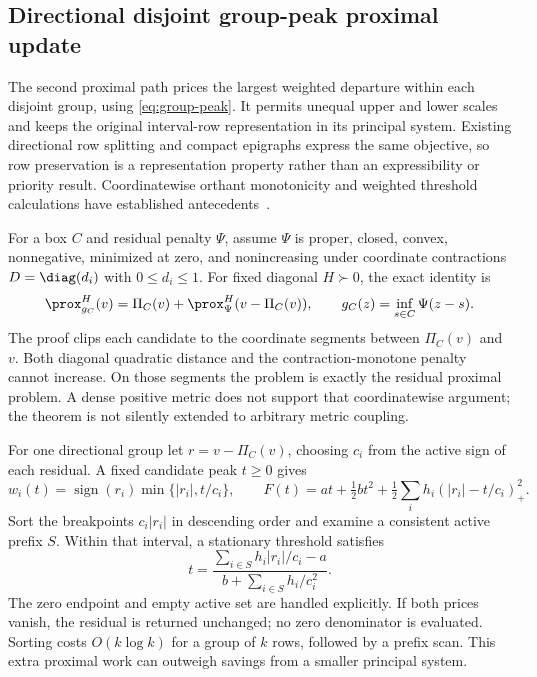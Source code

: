 \subsection{Directional disjoint group-peak proximal update}\label{sec:directional}
The second proximal path prices the largest weighted departure within each
disjoint group, using \eqref{eq:group-peak}. It permits unequal upper and lower
scales and keeps the original interval-row representation in its principal
system. Existing directional row splitting and compact epigraphs express the
same objective, so row preservation is a representation property rather than
an expressibility or priority result. Coordinatewise orthant monotonicity and
weighted threshold calculations have established antecedents~\cite{orthant,weighted}.

For a box $C$ and residual penalty $\Psi$, assume $\Psi$ is proper, closed,
convex, nonnegative, minimized at zero, and nonincreasing under coordinate
contractions $D=\diag(d_i)$ with $0\leq d_i\leq1$. For fixed diagonal $H\succ0$,
the exact identity is
\begin{equation}\label{eq:directional-prox}
 \prox_{g_C}^{H}(v)=\Pi_C(v)+\prox_{\Psi}^{H}(v-\Pi_C(v)),\qquad
 g_C(z)=\inf_{s\in C}\Psi(z-s).
\end{equation}
The proof clips each candidate to the coordinate segments between $\Pi_C(v)$
and $v$. Both diagonal quadratic distance and the contraction-monotone penalty
cannot increase. On those segments the problem is exactly the residual
proximal problem. A dense positive metric does not support that coordinatewise
argument; the theorem is not silently extended to arbitrary metric coupling.

For one directional group let $r=v-\Pi_C(v)$, choosing $c_i$ from the active
sign of each residual. A fixed candidate peak $t\geq0$ gives
\begin{equation}\label{eq:directional-clipping}
 w_i(t)=\operatorname{sign}(r_i)\min\{|r_i|,t/c_i\},\qquad
 F(t)=at+\tfrac12bt^2+\tfrac12\sum_i h_i(|r_i|-t/c_i)_+^2.
\end{equation}
Sort the breakpoints $c_i|r_i|$ in descending order and examine a consistent active prefix $S$.
Within that interval, a stationary threshold satisfies
\begin{equation}\label{eq:directional-threshold}
 t=\frac{\sum_{i\in S}h_i|r_i|/c_i-a}
          {b+\sum_{i\in S}h_i/c_i^2}.
\end{equation}
The zero endpoint and empty active set are handled explicitly. If both prices
vanish, the residual is returned unchanged; no zero denominator is evaluated.
Sorting costs $O(k\log k)$ for a group of $k$ rows, followed by a prefix scan.
This extra proximal work can outweigh savings from a smaller principal system.

